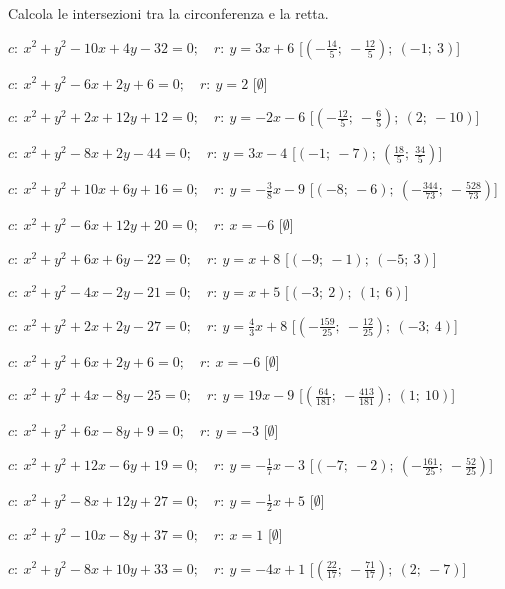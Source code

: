 \subsubsection*{}

\begin{esercizio}\label{ese:}
 Calcola le intersezioni tra la circonferenza e la retta.
 \begin{enumeratea}
  \item  \(c:~x^2 + y^2 -10x +4y -32 = 0; \quad r:~y = 3 x +6\)
   \hfill [\(\left (-\frac{14}{5};~-\frac{12}{5} \right );~\left (-1;~3 
\right )\)]
  \item  \(c:~x^2 + y^2 -6x +2y +6 = 0; \quad r:~y = 2\)
   \hfill [\(\emptyset\)]
  \item  \(c:~x^2 + y^2 +2x +12y +12 = 0; \quad r:~y = -2 x -6\)
   \hfill [\(\left (-\frac{12}{5};~-\frac{6}{5} \right );~\left (2;~-10 
\right )\)]
  \item  \(c:~x^2 + y^2 -8x +2y -44 = 0; \quad r:~y = 3 x -4\)
   \hfill [\(\left (-1;~-7 \right );~\left (\frac{18}{5};~\frac{34}{5} 
\right 
)\)]
  \item  \(c:~x^2 + y^2 +10x +6y +16 = 0; \quad r:~y = -\frac{3}{8} x -9\)
   \hfill [\(\left (-8;~-6 \right );~\left 
(-\frac{344}{73};~-\frac{528}{73} 
\right )\)]
  \item  \(c:~x^2 + y^2 -6x +12y +20 = 0; \quad r:~x = -6\)
   \hfill [\(\emptyset\)]
  \item  \(c:~x^2 + y^2 +6x +6y -22 = 0; \quad r:~y = x +8\)
   \hfill [\(\left (-9;~-1 \right );~\left (-5;~3 \right )\)]
  \item  \(c:~x^2 + y^2 -4x -2y -21 = 0; \quad r:~y = x +5\)
   \hfill [\(\left (-3;~2 \right );~\left (1;~6 \right )\)]
  \item  \(c:~x^2 + y^2 +2x +2y -27 = 0; \quad r:~y = \frac{4}{3} x +8\)
   \hfill [\(\left (-\frac{159}{25};~-\frac{12}{25} \right );~\left (-3;~4 
\right )\)]
  \item  \(c:~x^2 + y^2 +6x +2y +6 = 0; \quad r:~x = -6\)
   \hfill [\(\emptyset\)]
  \item  \(c:~x^2 + y^2 +4x -8y -25 = 0; \quad r:~y = 19 x -9\)
   \hfill [\(\left (\frac{64}{181};~-\frac{413}{181} \right );~\left (1;~10 
\right )\)]
  \item  \(c:~x^2 + y^2 +6x -8y +9 = 0; \quad r:~y = -3\)
   \hfill [\(\emptyset\)]
  \item  \(c:~x^2 + y^2 +12x -6y +19 = 0; \quad r:~y = -\frac{1}{7} x -3\)
   \hfill [\(\left (-7;~-2 \right );~\left (-\frac{161}{25};~-\frac{52}{25} 
\right )\)]
  \item  \(c:~x^2 + y^2 -8x +12y +27 = 0; \quad r:~y = -\frac{1}{2} x +5\)
   \hfill [\(\emptyset\)]
  \item  \(c:~x^2 + y^2 -10x -8y +37 = 0; \quad r:~x = 1\)
   \hfill [\(\emptyset\)]
  \item  \(c:~x^2 + y^2 -8x +10y +33 = 0; \quad r:~y = -4 x +1\)
   \hfill [\(\left (\frac{22}{17};~-\frac{71}{17} \right );~\left (2;~-7 
\right )\)]
 \end{enumeratea}
\end{esercizio}

